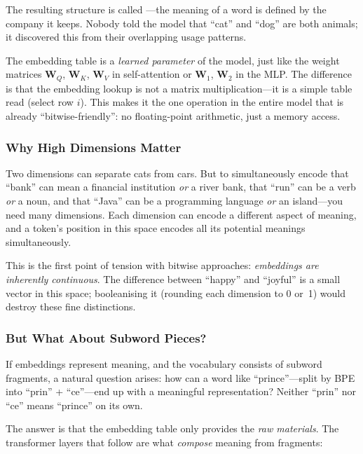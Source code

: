 The resulting structure is called ---the meaning of a word is defined by the company it
keeps. Nobody told the model that ``cat'' and ``dog'' are both
animals; it discovered this from their overlapping usage patterns.

\begin{engineernote}
The embedding table is a \emph{learned parameter} of the model, just
like the weight matrices $\bm{W}_Q$, $\bm{W}_K$, $\bm{W}_V$ in
self-attention or $\bm{W}_1$, $\bm{W}_2$ in the MLP. The difference
is that the embedding lookup is not a matrix multiplication---it is a
simple table read (select row $i$). This makes it the one operation
in the entire model that is already ``bitwise-friendly'': no
floating-point arithmetic, just a memory access.
\end{engineernote}

\subsubsection{Why High Dimensions Matter}

Two dimensions can separate cats from cars. But to simultaneously
encode that ``bank'' can mean a financial institution \emph{or} a
river bank, that ``run'' can be a verb \emph{or} a noun, and that
``Java'' can be a programming language \emph{or} an island---you need
many dimensions. Each dimension can encode a different aspect of
meaning, and a token's position in this space encodes all its
potential meanings simultaneously.

This is the first point of tension with bitwise approaches:
\emph{embeddings are inherently continuous}. The difference between
``happy'' and ``joyful'' is a small vector in this space; booleanising
it (rounding each dimension to 0 or~1) would destroy these fine
distinctions.

\subsubsection{But What About Subword Pieces?}

If embeddings represent meaning, and the vocabulary consists of
subword fragments, a natural question arises: how can a word like
``prince''---split by BPE into ``prin'' + ``ce''---end up with a
meaningful representation? Neither ``prin'' nor ``ce'' means
``prince'' on its own.

The answer is that the embedding table only provides the
\emph{raw materials}. The transformer layers that follow are what
\emph{compose} meaning from fragments:

